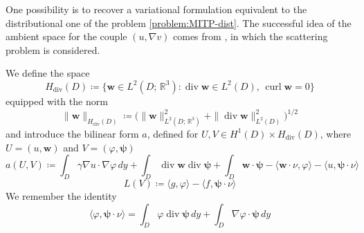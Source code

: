 \documentclass[10pt, a4paper, twoside, openright]{book}
\theoremstyle{definition}
\theoremstyle{plain}
\theoremstyle{plain}
\theoremstyle{plain}
\theoremstyle{plain}
\theoremstyle{plain}
\theoremstyle{plain}
\theoremstyle{plain}
\theoremstyle{plain}
\DeclareMathOperator{\divergence}{div}
\DeclareMathOperator{\curl}{curl}
\let\phi\varphi
\begin{document}
One possibility is to recover a variational formulation equivalent to the distributional one of 
the problem \ref{problem:MITP-dist}. The successful idea of the ambient space for the couple 
$(u,\nabla v)$ comes from \cite{cakoni-colton-haddar:lsm}, in which the scattering problem is considered.
\par
We define the space
\begin{equation}
 H_{\divergence}(D)\coloneqq\bigl\{\bm{w}\in L^2(D;\,\mathbb{R}^3):\divergence\bm{w} \in L^2(D),\, \curl\bm{w}=0 \bigr\}
\end{equation}
equipped with the norm
\begin{equation}
 \|\bm{w}\|_{H_{\divergence}(D)}\coloneqq\bigl(\|\bm{w}\|^2_{L^2(D;\,\mathbb{R}^3)} + \|\divergence\bm{w}\|^2_{L^2(D)}\bigr)^{1/2}
\end{equation}
and introduce the bilinear form $a$, defined for $U,V\in H^1(D)\times H_{\divergence}(D)$, where $U=(u,\bm{w})$ and $V=(\phi,\bm{\psi})$
\begin{equation}
 a(U,V)\coloneqq \int_D \gamma \nabla u\cdot\nabla \phi\,dy + \int_D\divergence \bm{w}\divergence\bm{\psi} + \int_D\bm{w}\cdot\bm{\psi} - \langle \bm{w}\cdot\nu, \phi \rangle- \langle u,\bm{\psi}\cdot\nu\rangle
\end{equation}
\begin{equation}
 L(V)\coloneqq \langle g, \phi\rangle - \langle f, \bm{\psi}\cdot\nu\rangle
\end{equation}
We remember the identity
\begin{equation}
 \label{eq:identity-duality}
 \langle\phi,\bm{\psi}\cdot\nu\rangle = \int_D\phi\divergence\bm\psi\,dy + \int_D\nabla\phi\cdot\bm{\psi}\,dy
\end{equation}
\end{document}
